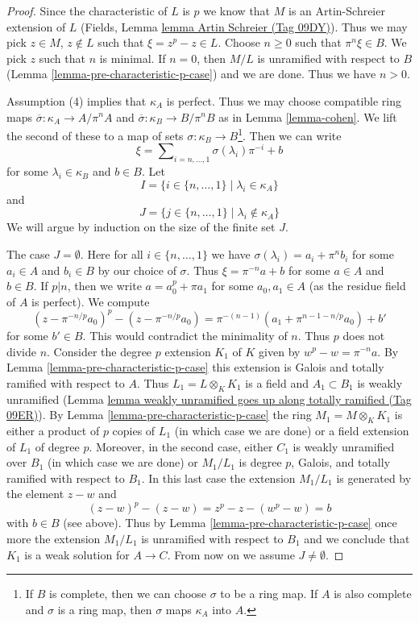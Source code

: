 \documentclass{amsart}
\theoremstyle{plain}
\theoremstyle{definition}
\theoremstyle{remark}
\numberwithin{equation}{subsection}
\begin{document}
\begin{proof}
Since the characteristic of $L$ is $p$ we know that $M$ is an Artin-Schreier
extension of $L$ (Fields, Lemma \href{https://stacks.math.columbia.edu/tag/09DY}{lemma Artin Schreier (Tag 09DY)}).
Thus we may pick $z \in M$, $z \not \in L$ such that
$\xi = z^p - z \in L$. Choose $n \geq 0$ such that $\pi^n\xi \in B$.
We pick $z$ such that $n$ is minimal. If $n = 0$, then $M/L$ is unramified
with respect to $B$ (Lemma \ref{lemma-pre-characteristic-p-case}) and
we are done. Thus we have $n > 0$.

\medskip\noindent
Assumption (4) implies that $\kappa_A$ is perfect. Thus we may
choose compatible ring maps $\overline{\sigma} : \kappa_A \to A/\pi^n A$ and
$\overline{\sigma} : \kappa_B \to B/\pi^n B$ as in
Lemma \ref{lemma-cohen}. We lift the second of these to a
map of sets $\sigma : \kappa_B \to B$\footnote{If $B$ is complete, then
we can choose $\sigma$ to be a ring map. If $A$ is also complete and
$\sigma$ is a ring map, then $\sigma$ maps $\kappa_A$ into $A$.}.
Then we can write
$$
\xi = \sum\nolimits_{i = n, \ldots, 1} \sigma(\lambda_i) \pi^{-i} + b
$$
for some $\lambda_i \in \kappa_B$ and $b \in B$. Let
$$
I = \{i \in \{n, \ldots, 1\} \mid \lambda_i \in \kappa_A\}
$$
and
$$
J = \{j \in \{n, \ldots, 1\} \mid \lambda_i \not \in \kappa_A\}
$$
We will argue by induction on the size of the finite set $J$.

\medskip\noindent
The case $J = \emptyset$. Here for all $i \in \{n, \ldots, 1\}$ we have
$\sigma(\lambda_i) = a_i + \pi^n b_i$ for some $a_i \in A$ and $b_i \in B$
by our choice of $\sigma$. Thus
$\xi = \pi^{-n} a + b$ for some $a \in A$ and $b \in B$.
If $p | n$, then we write $a = a_0^p + \pi a_1$ for some $a_0, a_1 \in A$
(as the residue field of $A$ is perfect). We compute
$$
(z - \pi^{-n/p}a_0)^p - (z - \pi^{-n/p}a_0) =
\pi^{-(n - 1)}(a_1 + \pi^{n - 1 - n/p}a_0) + b'
$$
for some $b' \in B$. This would contradict the minimality of $n$. Thus $p$
does not divide $n$. Consider the degree $p$ extension $K_1$ of $K$ given
by $w^p - w = \pi^{-n}a$. By Lemma \ref{lemma-pre-characteristic-p-case}
this extension is Galois and totally ramified with respect to $A$.
Thus $L_1 = L \otimes_K K_1$ is a field and $A_1 \subset B_1$
is weakly unramified
(Lemma \href{https://stacks.math.columbia.edu/tag/09ER}{lemma weakly unramified goes up along totally ramified (Tag 09ER)}).
By Lemma \ref{lemma-pre-characteristic-p-case}
the ring $M_1 = M \otimes_K K_1$ is either a product of $p$ copies
of $L_1$ (in which case we are done) or a field extension of $L_1$
of degree $p$. Moreover, in the second case, either $C_1$ is weakly unramified
over $B_1$ (in which case we are done) or $M_1/L_1$ is degree $p$,
Galois, and totally ramified with respect to $B_1$.
In this last case the extension $M_1/L_1$
is generated by the element $z - w$ and
$$
(z - w)^p - (z - w) = z^p - z - (w^p - w) = b
$$
with $b \in B$ (see above). Thus by Lemma \ref{lemma-pre-characteristic-p-case}
once more the extension $M_1/L_1$ is unramified with respect to $B_1$
and we conclude that $K_1$ is a weak solution for $A \to C$.
From now on we assume $J \not = \emptyset$.


\end{proof}
\end{document}
